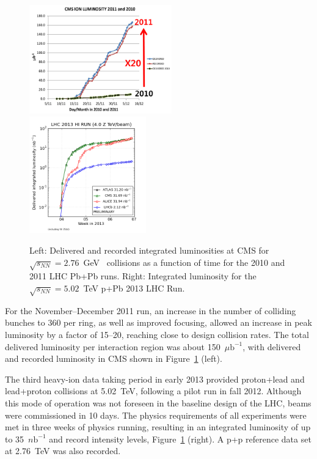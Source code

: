 \begin{figure}[ht]
\centerline{
\includegraphics[width=0.55\textwidth]{fig/IntegratedLumPbPb.png}
\includegraphics[width=0.45\textwidth]{fig/IntegratedLumpPbII.png}
}
\caption[LHC luminosity]{Left: Delivered and recorded integrated luminosities at 
CMS for $\sqrt{s_{NN}}=2.76$~GeV \PbPb\ collisions as a function of 
time for the 2010 and 2011 LHC Pb+Pb runs.
Right: Integrated luminosity for the $\sqrt{s_{NN}}=5.02$~TeV p+Pb 2013 LHC Run.
}
\label{Fig:LHCLum}
\end{figure}
For the November--December 2011 run, an increase in the number of 
colliding bunches to 360 per ring, as well as improved focusing, allowed 
an increase in peak luminosity by a factor of 15--20, reaching close to 
design collision rates. The total delivered luminosity per interaction region 
was about 150~$\mu \mathrm{b}^{-1}$, with delivered and 
recorded luminosity in CMS shown in Figure~\ref{Fig:LHCLum} (left).

The third heavy-ion data taking period in early 2013 provided proton+lead and lead+proton
collisions at 5.02~TeV, following a pilot run in fall 2012.
Although this mode of operation was not foreseen in the baseline design of the LHC,
beams were commissioned in 10 days. The physics requirements of all experiments 
were met in three weeks of physics running, resulting in an integrated luminosity of up to 
35~$n \mathrm{b}^{-1}$ and record intensity levels, Figure~\ref{Fig:LHCLum} (right).  
A p+p reference data set at 2.76~TeV was also recorded. 

